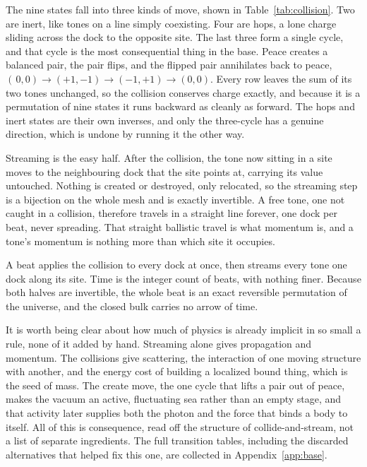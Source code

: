 The nine states fall into three kinds of move, shown in Table~\ref{tab:collision}. Two are inert, like tones on a line simply coexisting. Four are hops, a lone charge sliding across the dock to the opposite site. The last three form a single cycle, and that cycle is the most consequential thing in the base. Peace creates a balanced pair, the pair flips, and the flipped pair annihilates back to peace, $(\,0,0) \to (+1,-1) \to (-1,+1) \to (0,0)$. Every row leaves the sum of its two tones unchanged, so the collision conserves charge exactly, and because it is a permutation of nine states it runs backward as cleanly as forward. The hops and inert states are their own inverses, and only the three-cycle has a genuine direction, which is undone by running it the other way.

Streaming is the easy half. After the collision, the tone now sitting in a site moves to the neighbouring dock that the site points at, carrying its value untouched. Nothing is created or destroyed, only relocated, so the streaming step is a bijection on the whole mesh and is exactly invertible. A free tone, one not caught in a collision, therefore travels in a straight line forever, one dock per beat, never spreading. That straight ballistic travel is what momentum is, and a tone's momentum is nothing more than which site it occupies.

\begin{result}
A beat applies the collision to every dock at once, then streams every tone one dock along its site. Time is the integer count of beats, with nothing finer. Because both halves are invertible, the whole beat is an exact reversible permutation of the universe, and the closed bulk carries no arrow of time.
\end{result}

It is worth being clear about how much of physics is already implicit in so small a rule, none of it added by hand. Streaming alone gives propagation and momentum. The collisions give scattering, the interaction of one moving structure with another, and the energy cost of building a localized bound thing, which is the seed of mass. The create move, the one cycle that lifts a pair out of peace, makes the vacuum an active, fluctuating sea rather than an empty stage, and that activity later supplies both the photon and the force that binds a body to itself. All of this is consequence, read off the structure of collide-and-stream, not a list of separate ingredients. The full transition tables, including the discarded alternatives that helped fix this one, are collected in Appendix~\ref{app:base}.
